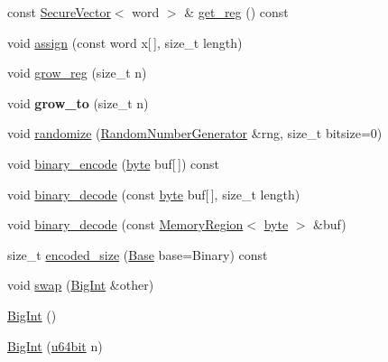 \begin{DoxyCompactItemize}
\item 
const \hyperlink{classBotan_1_1SecureVector}{Secure\-Vector}$<$ word $>$ \& \hyperlink{classBotan_1_1BigInt_afb0741a172ad7cccaaa9271ca51c77e8}{get\-\_\-reg} () const 
\item 
void \hyperlink{classBotan_1_1BigInt_a6e4c47a07137d296fe81a5281b34827e}{assign} (const word x\mbox{[}$\,$\mbox{]}, size\-\_\-t length)
\item 
void \hyperlink{classBotan_1_1BigInt_af265c6b8795377702d359d4dec29abde}{grow\-\_\-reg} (size\-\_\-t n)
\item 
\hypertarget{classBotan_1_1BigInt_af86e79f2efb203a3e516c69fd17456fc}{void {\bfseries grow\-\_\-to} (size\-\_\-t n)}\label{classBotan_1_1BigInt_af86e79f2efb203a3e516c69fd17456fc}

\item 
void \hyperlink{classBotan_1_1BigInt_ac2623aedfe7d238fa84e5ceabb5c9b62}{randomize} (\hyperlink{classBotan_1_1RandomNumberGenerator}{Random\-Number\-Generator} \&rng, size\-\_\-t bitsize=0)
\item 
void \hyperlink{classBotan_1_1BigInt_ad35cf947f7073ba2491fd4d6c815477e}{binary\-\_\-encode} (\hyperlink{namespaceBotan_a7d793989d801281df48c6b19616b8b84}{byte} buf\mbox{[}$\,$\mbox{]}) const 
\item 
void \hyperlink{classBotan_1_1BigInt_ad943c9ea1ee8ad61dddf4676fee90a01}{binary\-\_\-decode} (const \hyperlink{namespaceBotan_a7d793989d801281df48c6b19616b8b84}{byte} buf\mbox{[}$\,$\mbox{]}, size\-\_\-t length)
\item 
void \hyperlink{classBotan_1_1BigInt_af4f63e884e187b9803e48d0dbdf8d3de}{binary\-\_\-decode} (const \hyperlink{classBotan_1_1MemoryRegion}{Memory\-Region}$<$ \hyperlink{namespaceBotan_a7d793989d801281df48c6b19616b8b84}{byte} $>$ \&buf)
\item 
size\-\_\-t \hyperlink{classBotan_1_1BigInt_a1a104b8293070dea2519298c67a6147e}{encoded\-\_\-size} (\hyperlink{classBotan_1_1BigInt_a2f432a3a957f2e25c78af361ab662a23}{Base} base=Binary) const 
\item 
void \hyperlink{classBotan_1_1BigInt_a08f31541fa525aefb9d2744f189e86b6}{swap} (\hyperlink{classBotan_1_1BigInt}{Big\-Int} \&other)
\item 
\hyperlink{classBotan_1_1BigInt_a544a1fb74feef89c36a0aa5cdadfe421}{Big\-Int} ()
\item 
\hyperlink{classBotan_1_1BigInt_a4a287e157587862f1c6e8b80516e18f0}{Big\-Int} (\hyperlink{namespaceBotan_a634063d9fb05e25262ca94ed927030f6}{u64bit} n)
\item 

\end{DoxyCompactItemize}
